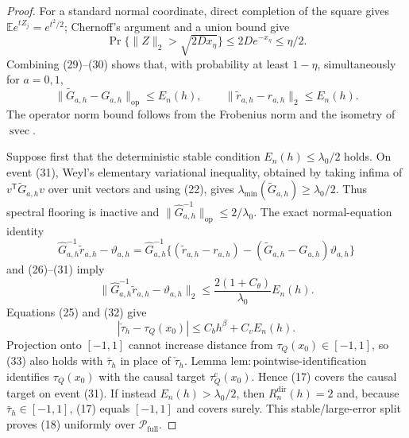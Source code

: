 \documentclass{article}
\begin{document}
\begin{proof}
For a standard normal coordinate, direct completion of the square gives \(\mathbb Ee^{tZ_j}=e^{t^2/2}\); Chernoff's argument and a union bound give
\[
 \Pr\{\|Z\|_2>\sqrt{2Dx_\eta}\}\le2De^{-x_\eta}\le\eta/2.
\tag{30}
\]
Combining (29)--(30) shows that, with probability at least \(1-\eta\), simultaneously for \(a=0,1\),
\[
 \|\widetilde G_{a,h}-G_{a,h}\|_{\mathrm{op}}
 \le E_n(h),
 \qquad
 \|\widetilde r_{a,h}-r_{a,h}\|_2\le E_n(h).
\tag{31}
\]
The operator norm bound follows from the Frobenius norm and the isometry of \(\operatorname{svec}\).

Suppose first that the deterministic stable condition \(E_n(h)\le\lambda_0/2\) holds.  On event (31), Weyl's elementary variational inequality, obtained by taking infima of \(v^{\mathsf T}\widetilde G_{a,h}v\) over unit vectors and using (22), gives \(\lambda_{\min}(\widetilde G_{a,h})\ge\lambda_0/2\).  Thus spectral flooring is inactive and \(\|\widehat G_{a,h}^{-1}\|_{\mathrm{op}}\le2/\lambda_0\).  The exact normal-equation identity
\[
 \widehat G_{a,h}^{-1}\widetilde r_{a,h}-\vartheta_{a,h}
 =\widehat G_{a,h}^{-1}
 \{(\widetilde r_{a,h}-r_{a,h})
   -(\widetilde G_{a,h}-G_{a,h})\vartheta_{a,h}\}
\]
and (26)--(31) imply
\[
 \|\widehat G_{a,h}^{-1}\widetilde r_{a,h}-\vartheta_{a,h}\|_2
 \le \frac{2(1+C_\theta)}{\lambda_0}E_n(h).
\tag{32}
\]
Equations (25) and (32) give
\[
 |\check\tau_h-\tau_Q(x_0)|\le C_bh^\beta+C_vE_n(h).
\tag{33}
\]
Projection onto \([-1,1]\) cannot increase distance from \(\tau_Q(x_0)\in[-1,1]\), so (33) also holds with \(\bar\tau_h\) in place of \(\check\tau_h\).  Lemma \(\mathrm{lem{:}pointwise\text{-}identification}\) identifies \(\tau_Q(x_0)\) with the causal target \(\tau_Q^{\mathrm c}(x_0)\).  Hence (17) covers the causal target on event (31).  If instead \(E_n(h)>\lambda_0/2\), then \(R_n^{\mathrm{dir}}(h)=2\) and, because \(\bar\tau_h\in[-1,1]\), (17) equals \([-1,1]\) and covers surely.  This stable/large-error split proves (18) uniformly over \(\mathcal P_{\mathrm{full}}\).


\end{proof}
\end{document}

